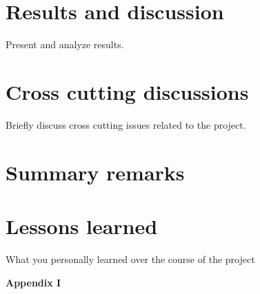 \documentclass[11pt,a4paper]{article}
\begin{document}
\newpage

\section{Results and discussion}
Present and analyze results.

\newpage

\section{Cross cutting discussions}
Briefly discuss cross cutting issues related to the project.

\newpage

\section{Summary remarks}

\newpage

\section{Lessons learned}

What you personally learned over the course of the project

%
%

\newpage

\noindent\Large{\textbf{Appendix I}}
\end{document}
